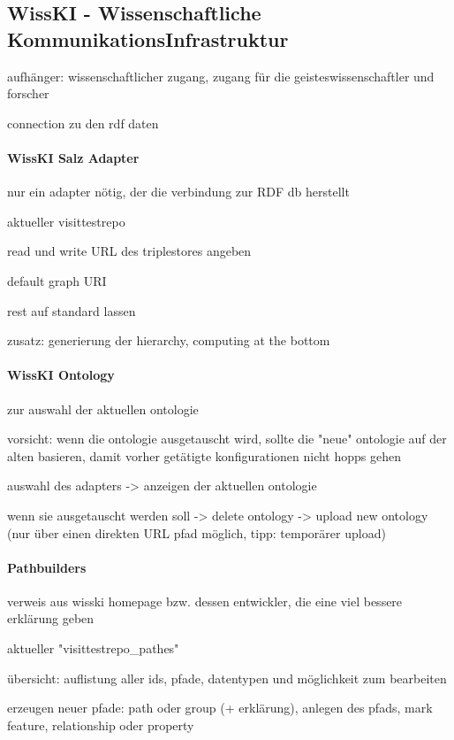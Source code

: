 \subsection{WissKI - Wissenschaftliche KommunikationsInfrastruktur}\label{sec:wisski}

aufhänger: wissenschaftlicher zugang, zugang für die geisteswissenschaftler und forscher

connection zu den rdf daten

\paragraph{WissKI Salz Adapter}

nur ein adapter nötig, der die verbindung zur RDF db herstellt

aktueller visittestrepo

read und write URL des triplestores angeben

default graph URI

rest auf standard lassen

zusatz: generierung der hierarchy, computing at the bottom

\paragraph{WissKI Ontology}

zur auswahl der aktuellen ontologie

vorsicht: wenn die ontologie ausgetauscht wird, sollte die "neue" ontologie auf der alten basieren, damit vorher getätigte konfigurationen nicht hopps gehen

auswahl des adapters -> anzeigen der aktuellen ontologie

wenn sie ausgetauscht werden soll -> delete ontology -> upload new ontology (nur über einen direkten URL pfad möglich, tipp: temporärer upload)

\paragraph{Pathbuilders}

verweis aus wisski homepage bzw. dessen entwickler, die eine viel bessere erklärung geben

aktueller "visittestrepo\_pathes"

übersicht: auflistung aller ids, pfade, datentypen und möglichkeit zum bearbeiten

erzeugen neuer pfade: path oder group (+ erklärung), anlegen des pfads, mark feature, relationship oder property

